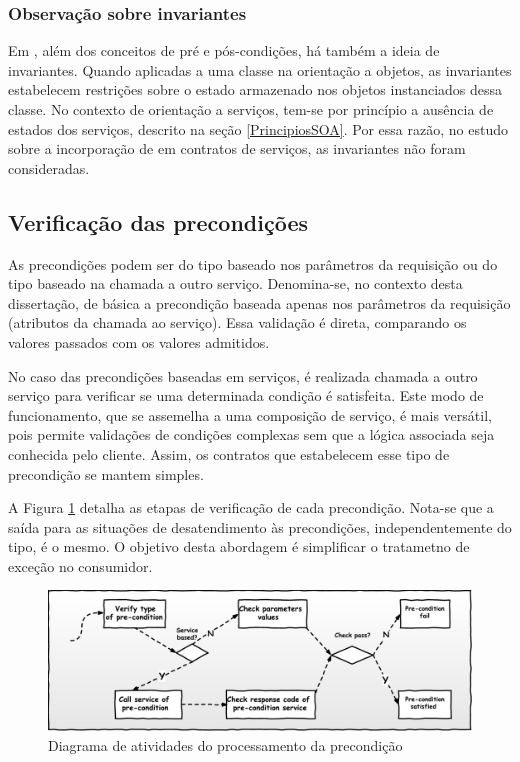 \subsubsection{Observação sobre invariantes}
\vspace{-6mm}

Em \designbycontract{}, além dos conceitos de pré e pós-condições,
há também a ideia de invariantes\cite{meyer1997object}. Quando aplicadas a uma classe na
orientação a objetos, as invariantes estabelecem restrições sobre o estado
armazenado nos objetos instanciados dessa classe. No contexto de orientação a
serviços, tem-se por princípio a ausência de estados dos serviços, descrito na
seção \ref{PrincipiosSOA}. Por essa razão, no estudo sobre a incorporação de
\designbycontract{} em contratos de serviços, as invariantes não foram
consideradas.


\subsection{Verificação das precondições}
\vspace{-6mm}

As precondições podem ser do tipo baseado nos parâmetros da requisição ou do
tipo baseado na chamada a outro serviço. Denomina-se, no contexto desta
dissertação, de básica a precondição baseada apenas nos parâmetros da
requisição (atributos da chamada ao serviço). Essa validação é direta,
comparando os valores passados com os valores admitidos. 

No caso das precondições baseadas em serviços, é realizada chamada a outro
serviço para verificar se uma determinada condição é satisfeita. Este modo de
funcionamento, que se assemelha a uma composição de serviço, é mais versátil, pois permite
validações de condições complexas sem que a lógica associada seja conhecida pelo
cliente. Assim, os contratos que estabelecem esse tipo de
precondição se mantem simples.

A Figura \ref{FigServicePrecondition} detalha as etapas de verificação de cada
precondição. Nota-se que a saída para as situações de desatendimento às
precondições, independentemente do tipo, é o mesmo. O objetivo desta abordagem
é simplificar o tratametno de exceção no consumidor.

\begin{figure}[!htb]
\centering
\includegraphics[width=140mm,trim = 0mm 0mm 0mm
0mm,clip]{img/FluxoPrecondicoes.pdf}
\caption{Diagrama de atividades do processamento da precondição}
\label{FigServicePrecondition}
\end{figure}


